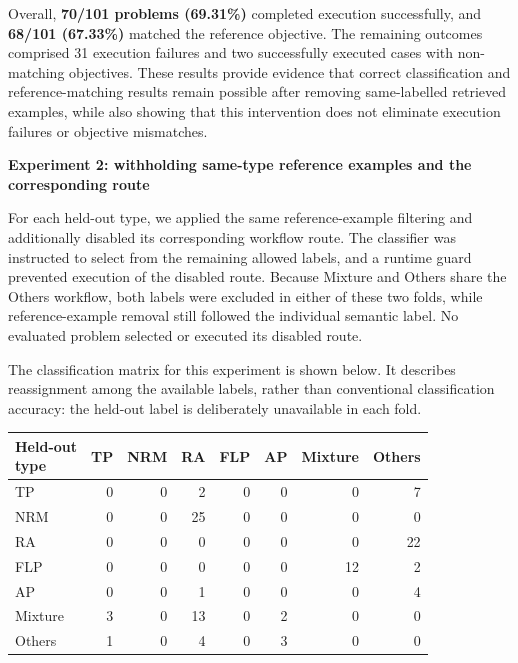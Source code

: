 \documentclass[11pt]{article}
\begin{document}
\begin{enumerate}[label=(AssoE.\arabic*),leftmargin=*]
\begin{enumerate}[label=(R1.Major.\arabic*),leftmargin=*]
Overall, \textbf{70/101 problems (69.31\%)} completed execution successfully, and \textbf{68/101 (67.33\%)} matched the reference objective. The remaining outcomes comprised 31 execution failures and two successfully executed cases with non-matching objectives. These results provide evidence that correct classification and reference-matching results remain possible after removing same-labelled retrieved examples, while also showing that this intervention does not eliminate execution failures or objective mismatches.

\medskip
\noindent\textbf{Experiment 2: withholding same-type reference examples and the corresponding route}

For each held-out type, we applied the same reference-example filtering and additionally disabled its corresponding workflow route. The classifier was instructed to select from the remaining allowed labels, and a runtime guard prevented execution of the disabled route. Because Mixture and Others share the Others workflow, both labels were excluded in either of these two folds, while reference-example removal still followed the individual semantic label. No evaluated problem selected or executed its disabled route.

The classification matrix for this experiment is shown below. It describes reassignment among the available labels, rather than conventional classification accuracy: the held-out label is deliberately unavailable in each fold.

\begin{center}
\small
\setlength{\tabcolsep}{5pt}
\renewcommand{\arraystretch}{1.12}
\begin{tabular}{lrrrrrrr}
\hline
\shortstack[l]{Held-out\\type}
& TP & NRM & RA & FLP & AP & Mixture & Others \\
\hline
TP      & 0 & 0 & 2  & 0 & 0 & 0  & 7  \\
NRM     & 0 & 0 & 25 & 0 & 0 & 0  & 0  \\
RA      & 0 & 0 & 0  & 0 & 0 & 0  & 22 \\
FLP     & 0 & 0 & 0  & 0 & 0 & 12 & 2  \\
AP      & 0 & 0 & 1  & 0 & 0 & 0  & 4  \\
Mixture & 3 & 0 & 13 & 0 & 2 & 0  & 0  \\
Others  & 1 & 0 & 4  & 0 & 3 & 0  & 0  \\
\hline
\end{tabular}
\end{center}


\end{enumerate}
\end{enumerate}
\end{document}
